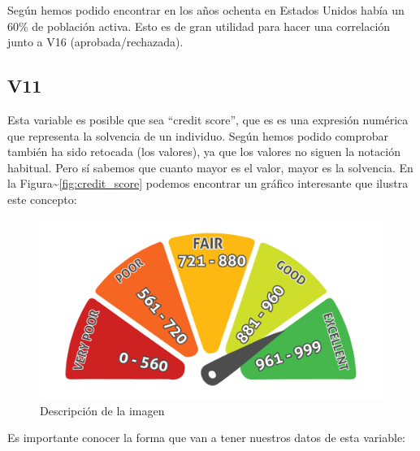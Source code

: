 \documentclass[
]{article}
\newenvironment{Shaded}{\begin{snugshade}}{\end{snugshade}}
\newcommand{\AttributeTok}[1]{\textcolor[rgb]{0.13,0.29,0.53}{#1}}
\newcommand{\ConstantTok}[1]{\textcolor[rgb]{0.56,0.35,0.01}{#1}}
\newcommand{\DecValTok}[1]{\textcolor[rgb]{0.00,0.00,0.81}{#1}}
\newcommand{\FunctionTok}[1]{\textcolor[rgb]{0.13,0.29,0.53}{\textbf{#1}}}
\newcommand{\NormalTok}[1]{#1}
\newcommand{\SpecialCharTok}[1]{\textcolor[rgb]{0.81,0.36,0.00}{\textbf{#1}}}
\newcommand{\StringTok}[1]{\textcolor[rgb]{0.31,0.60,0.02}{#1}}
\begin{document}
Según hemos podido encontrar en los años ochenta en Estados Unidos había
un 60\% de población activa. Esto es de gran utilidad para hacer una
correlación junto a V16 (aprobada/rechazada).

\hypertarget{v11}{%
\subsection{V11}\label{v11}}

Esta variable es posible que sea ``credit score'', que es es una
expresión numérica que representa la solvencia de un individuo. Según
hemos podido comprobar también ha sido retocada (los valores), ya que
los valores no siguen la notación habitual. Pero sí sabemos que cuanto
mayor es el valor, mayor es la solvencia. En la
Figura\textasciitilde{}\ref{fig:credit_score} podemos encontrar un
gráfico interesante que ilustra este concepto:

\begin{figure}
\centering
\includegraphics{imagenes/creditScorepx.png}
\caption{Descripción de la imagen}
\end{figure}

Es importante conocer la forma que van a tener nuestros datos de esta
variable:

\begin{Shaded}
\end{Shaded}
\end{document}
